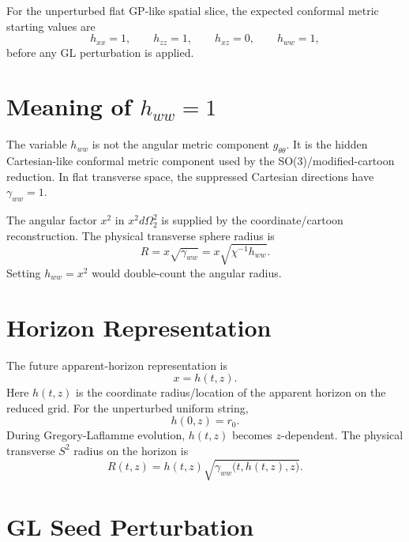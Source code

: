 \documentclass[11pt]{article}
\begin{document}
For the unperturbed flat GP-like spatial slice, the expected conformal metric
starting values are
\begin{equation}
  h_{xx}=1,
  \qquad
  h_{zz}=1,
  \qquad
  h_{xz}=0,
  \qquad
  h_{ww}=1,
\end{equation}
before any GL perturbation is applied.

\section{Meaning of \(h_{ww}=1\)}

The variable \(h_{ww}\) is not the angular metric component
\(g_{\theta\theta}\). It is the hidden Cartesian-like conformal metric
component used by the SO(3)/modified-cartoon reduction. In flat transverse
space, the suppressed Cartesian directions have \(\gamma_{ww}=1\).

The angular factor \(x^2\) in \(x^2d\Omega_2^2\) is supplied by the
coordinate/cartoon reconstruction. The physical transverse sphere radius is
\begin{equation}
  R
  =
  x\sqrt{\gamma_{ww}}
  =
  x\sqrt{\chi^{-1}h_{ww}} .
  \label{eq:cartoon-radius}
\end{equation}
Setting \(h_{ww}=x^2\) would double-count the angular radius.

\section{Horizon Representation}

The future apparent-horizon representation is
\begin{equation}
  x = h(t,z).
\end{equation}
Here \(h(t,z)\) is the coordinate radius/location of the apparent horizon on
the reduced grid. For the unperturbed uniform string,
\begin{equation}
  h(0,z)=r_0 .
\end{equation}
During Gregory-Laflamme evolution, \(h(t,z)\) becomes \(z\)-dependent. The
physical transverse \(S^2\) radius on the horizon is
\begin{equation}
  R(t,z)
  =
  h(t,z)
  \sqrt{
    \gamma_{ww}\bigl(t,h(t,z),z\bigr)
  } .
  \label{eq:horizon-radius}
\end{equation}

\section{GL Seed Perturbation}
\end{document}
